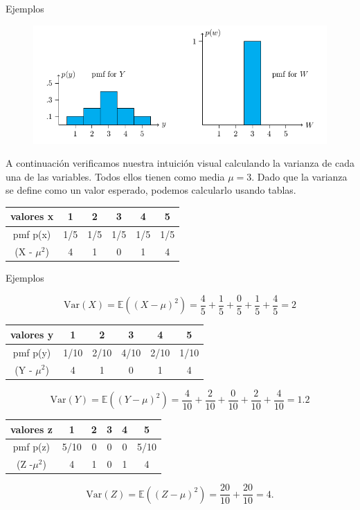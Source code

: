 \documentclass[10pt]{beamer}
\begin{document}
\begin{frame}{Ejemplos}
\small{ 
\begin{figure}[ht]
		\centering
		\includegraphics[scale=.35]{J3.png}
\end{figure}	

A continuaci\'on verificamos nuestra intuici\'on visual calculando la varianza de cada una de las variables. Todos ellos tienen como media $\mu = 3$. Dado que la varianza se define como un valor esperado, podemos calcularlo usando  tablas.

\vspace{0.2cm}

\begin{table}[]
 \begin{tabular}{c|ccccc}
 		valores  x & 1   & 2   & 3    & 4    & 5   \\
 		\hline
 		pmf p(x)   & 1/5 & 1/5 & 1/5 & 1/5 & 1/5 \\
 		\hline
 		(X - $\mu^2$) & 4 & 1 & 0 & 1 & 4
 	\end{tabular}
 \end{table}
	
}
\end{frame}

\begin{frame}{Ejemplos}
	\small{
\[
\text{Var}(X) = \mathbb{E}((X - \mu)^2) = \frac{4}{5} + \frac{1}{5} + \frac{0}{5} + \frac{1}{5} + \frac{4}{5} = 2
\]

\begin{table}[]
	\begin{tabular}{c|ccccc}
		valores  y & 1   & 2   & 3    & 4    & 5   \\
		\hline
		pmf p(y)   & 1/10 & 2/10 & 4/10 & 2/10 & 1/10\\
		\hline
		(Y - $\mu^2$) & 4 & 1 & 0 & 1 & 4
	\end{tabular}
\end{table}	

\[
\text{Var}(Y) = \mathbb{E}((Y - \mu)^2) = \frac{4}{10} + \frac{2}{10} + \frac{0}{10} + \frac{2}{10} + \frac{4}{10} = 1.2
\]

\begin{table}[]
	\begin{tabular}{c|ccccc}
		valores  z & 1   & 2   & 3    & 4    & 5   \\
		\hline
		pmf p(z)   & 5/10 & 0 & 0 & 0 & 5/10 \\
		\hline
		(Z -$\mu^2$) & 4 & 1 & 0 & 1 & 4
	\end{tabular}
\end{table}

\[
\text{Var}(Z) = \mathbb{E}((Z - \mu)^2) =  \frac{20}{10} +  \frac{20}{10} = 4.
\]
}
\end{frame}
\end{document}
